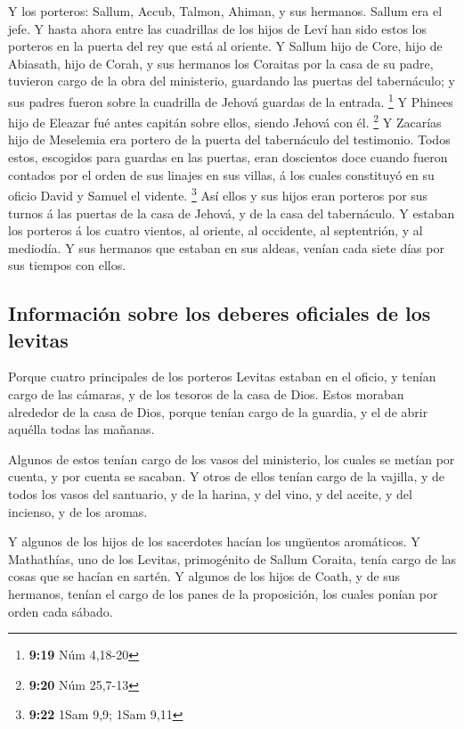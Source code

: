  Y los porteros: Sallum, Accub, Talmon, Ahiman, y sus
hermanos. Sallum era el jefe.  Y hasta ahora entre las
cuadrillas de los hijos de Leví han sido estos los porteros en la puerta
del rey que está al oriente.  Y Sallum hijo de Core, hijo
de Abiasath, hijo de Corah, y sus hermanos los Coraitas por la casa de
su padre, tuvieron cargo de la obra del ministerio, guardando las
puertas del tabernáculo; y sus padres fueron sobre la cuadrilla de
Jehová guardas de la entrada. \footnote{\textbf{9:19} Núm 4,18-20}
 Y Phinees hijo de Eleazar fué antes capitán sobre ellos,
siendo Jehová con él. \footnote{\textbf{9:20} Núm 25,7-13}
 Y Zacarías hijo de Meselemia era portero de la puerta
del tabernáculo del testimonio.  Todos estos, escogidos
para guardas en las puertas, eran doscientos doce cuando fueron contados
por el orden de sus linajes en sus villas, á los cuales constituyó en su
oficio David y Samuel el vidente. \footnote{\textbf{9:22} 1Sam 9,9; 1Sam
  9,11}  Así ellos y sus hijos eran porteros por sus
turnos á las puertas de la casa de Jehová, y de la casa del tabernáculo.
 Y estaban los porteros á los cuatro vientos, al oriente,
al occidente, al septentrión, y al mediodía.  Y sus
hermanos que estaban en sus aldeas, venían cada siete días por sus
tiempos con ellos.

\hypertarget{informaciuxf3n-sobre-los-deberes-oficiales-de-los-levitas}{%
\subsection{Información sobre los deberes oficiales de los
levitas}\label{informaciuxf3n-sobre-los-deberes-oficiales-de-los-levitas}}

 Porque cuatro principales de los porteros Levitas
estaban en el oficio, y tenían cargo de las cámaras, y de los tesoros de
la casa de Dios.  Estos moraban alrededor de la casa de
Dios, porque tenían cargo de la guardia, y el de abrir aquélla todas las
mañanas.

 Algunos de estos tenían cargo de los vasos del
ministerio, los cuales se metían por cuenta, y por cuenta se sacaban.
 Y otros de ellos tenían cargo de la vajilla, y de todos
los vasos del santuario, y de la harina, y del vino, y del aceite, y del
incienso, y de los aromas.

 Y algunos de los hijos de los sacerdotes hacían los
ungüentos aromáticos.  Y Mathathías, uno de los Levitas,
primogénito de Sallum Coraita, tenía cargo de las cosas que se hacían en
sartén.  Y algunos de los hijos de Coath, y de sus
hermanos, tenían el cargo de los panes de la proposición, los cuales
ponían por orden cada sábado.

